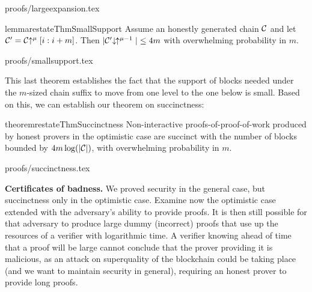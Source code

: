 \ifonecolumn
{proofs/largeexpansion.tex}
\fi

\begin{restatable}{lemma}{restateThmSmallSupport}
    \label{lem.small-support}
    Assume an honestly generated chain $\mathcal{C}$ and let $\mathcal{C}' = \mathcal{C}\negthickspace\uparrow^\mu[i:i + m]$. Then
    $|\mathcal{C}'\negthickspace\downarrow\,\negthickspace\uparrow^{\mu - 1}| \leq 4m$
    with overwhelming probability in $m$.
\end{restatable}

\ifonecolumn
{proofs/smallsupport.tex}
\fi

This last theorem establishes the fact that the support of blocks needed under
the $m$-sized chain suffix to move from one level to the one below is small.
Based on this, we can establish our theorem on succinctness:

\begin{restatable}{theorem}{restateThmSuccinctness}
    \label{thm.succinctness}
    Non-interactive proofs-of-proof-of-work produced by honest provers in the
    optimistic case are succinct with the number of blocks bounded by $4m
    \log(|\mathcal{C}|)$, with overwhelming probability in $m$.
\end{restatable}

\ifonecolumn
{proofs/succinctness.tex}
\else
\fi

\textbf{Certificates of badness.}
We proved security in the general case, but succinctness only in the optimistic
case. Examine now the optimistic case extended with the adversary's ability to
provide proofs. It is then still possible for that adversary to produce large
dummy (incorrect) proofs that use up the resources of a verifier with
logarithmic time. A verifier knowing ahead of time that a proof will be large
cannot conclude that the prover providing it is malicious, as an attack on
superquality of the blockchain could be taking place (and we want to maintain
security in general), requiring an honest prover to provide long proofs.


